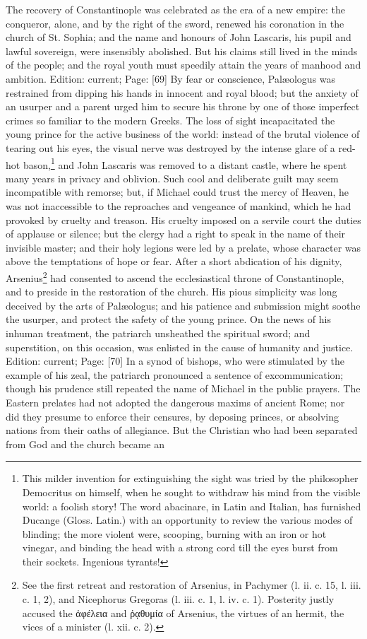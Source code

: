 The recovery of Constantinople was celebrated as the era of a new empire: the conqueror, alone, and by the right of the sword, renewed his coronation in the church of St. Sophia; and the name and honours of John Lascaris, his pupil and lawful sovereign, were insensibly abolished. But his claims still lived in the minds of the people; and the royal youth must speedily attain the years of manhood and ambition. Edition: current; Page: [69] By fear or conscience, Palæologus was restrained from dipping his hands in innocent and royal blood; but the anxiety of an usurper and a parent urged him to secure his throne by one of those imperfect crimes so familiar to the modern Greeks. The loss of sight incapacitated the young prince for the active business of the world: instead of the brutal violence of tearing out his eyes, the visual nerve was destroyed by the intense glare of a red-hot bason,\footnote{This milder invention for extinguishing the sight was tried by the philosopher Democritus on himself, when he sought to withdraw his mind from the visible world: a foolish story! The word abacinare, in Latin and Italian, has furnished Ducange (Gloss. Latin.) with an opportunity to review the various modes of blinding; the more violent were, scooping, burning with an iron or hot vinegar, and binding the head with a strong cord till the eyes burst from their sockets. Ingenious tyrants!} and John Lascaris was removed to a distant castle, where he spent many years in privacy and oblivion. Such cool and deliberate guilt may seem incompatible with remorse; but, if Michael could trust the mercy of Heaven, he was not inaccessible to the reproaches and vengeance of mankind, which he had provoked by cruelty and treason. His cruelty imposed on a servile court the duties of applause or silence; but the clergy had a right to speak in the name of their invisible master; and their holy legions were led by a prelate, whose character was above the temptations of hope or fear. After a short abdication of his dignity, Arsenius\footnote{See the first retreat and restoration of Arsenius, in Pachymer (l. ii. c. 15, l. iii. c. 1, 2), and Nicephorus Gregoras (l. iii. c. 1, l. iv. c. 1). Posterity justly accused the \textgreek{\texthebrew{ἀ}φέλεια} and \textgreek{\texthebrew{ῥᾳ}θυμία} of Arsenius, the virtues of an hermit, the vices of a minister (l. xii. c. 2).} had consented to ascend the ecclesiastical throne of Constantinople, and to preside in the restoration of the church. His pious simplicity was long deceived by the arts of Palæologus; and his patience and submission might soothe the usurper, and protect the safety of the young prince. On the news of his inhuman treatment, the patriarch unsheathed the spiritual sword; and superstition, on this occasion, was enlisted in the cause of humanity and justice. Edition: current; Page: [70] In a synod of bishops, who were stimulated by the example of his zeal, the patriarch pronounced a sentence of excommunication; though his prudence still repeated the name of Michael in the public prayers. The Eastern prelates had not adopted the dangerous maxims of ancient Rome; nor did they presume to enforce their censures, by deposing princes, or absolving nations from their oaths of allegiance. But the Christian who had been separated from God and the church became an 